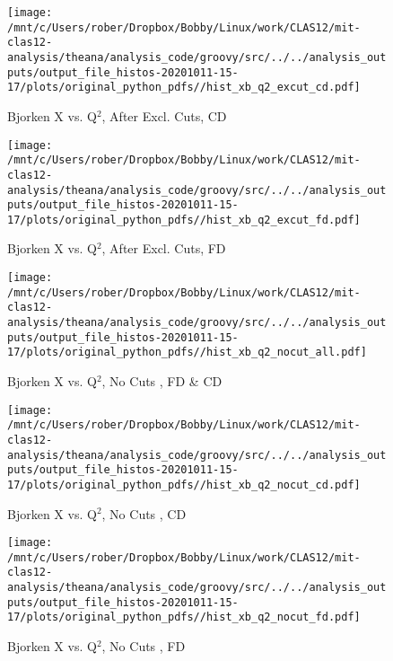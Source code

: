 \documentclass{article}
\begin{document}
\begin{landscape}
    \begin{figure}[h]
        \centering

        \texttt{[image: /mnt/c/Users/rober/Dropbox/Bobby/Linux/work/CLAS12/mit-clas12-analysis/theana/analysis\_code/groovy/src/../../analysis\_outputs/output\_file\_histos-20201011-15-17/plots/original\_python\_pdfs//hist\_xb\_q2\_excut\_cd.pdf]}
        \captionsetup{textformat=empty,labelformat=blank}
        \caption{Bjorken X vs. Q$^{2}$, After Excl. Cuts, CD}
    \end{figure}
    \clearpage
    
    \begin{figure}[h]
        \centering

        \texttt{[image: /mnt/c/Users/rober/Dropbox/Bobby/Linux/work/CLAS12/mit-clas12-analysis/theana/analysis\_code/groovy/src/../../analysis\_outputs/output\_file\_histos-20201011-15-17/plots/original\_python\_pdfs//hist\_xb\_q2\_excut\_fd.pdf]}
        \captionsetup{textformat=empty,labelformat=blank}
        \caption{Bjorken X vs. Q$^{2}$, After Excl. Cuts, FD}
    \end{figure}
    \clearpage
    
    \begin{figure}[h]
        \centering

        \texttt{[image: /mnt/c/Users/rober/Dropbox/Bobby/Linux/work/CLAS12/mit-clas12-analysis/theana/analysis\_code/groovy/src/../../analysis\_outputs/output\_file\_histos-20201011-15-17/plots/original\_python\_pdfs//hist\_xb\_q2\_nocut\_all.pdf]}
        \captionsetup{textformat=empty,labelformat=blank}
        \caption{Bjorken X vs. Q$^{2}$, No Cuts , FD \& CD}
    \end{figure}
    \clearpage
    
    \begin{figure}[h]
        \centering

        \texttt{[image: /mnt/c/Users/rober/Dropbox/Bobby/Linux/work/CLAS12/mit-clas12-analysis/theana/analysis\_code/groovy/src/../../analysis\_outputs/output\_file\_histos-20201011-15-17/plots/original\_python\_pdfs//hist\_xb\_q2\_nocut\_cd.pdf]}
        \captionsetup{textformat=empty,labelformat=blank}
        \caption{Bjorken X vs. Q$^{2}$, No Cuts , CD}
    \end{figure}
    \clearpage
    
    \begin{figure}[h]
        \centering

        \texttt{[image: /mnt/c/Users/rober/Dropbox/Bobby/Linux/work/CLAS12/mit-clas12-analysis/theana/analysis\_code/groovy/src/../../analysis\_outputs/output\_file\_histos-20201011-15-17/plots/original\_python\_pdfs//hist\_xb\_q2\_nocut\_fd.pdf]}
        \captionsetup{textformat=empty,labelformat=blank}
        \caption{Bjorken X vs. Q$^{2}$, No Cuts , FD}
    \end{figure}
    \clearpage
    

\end{landscape}
\end{document}

